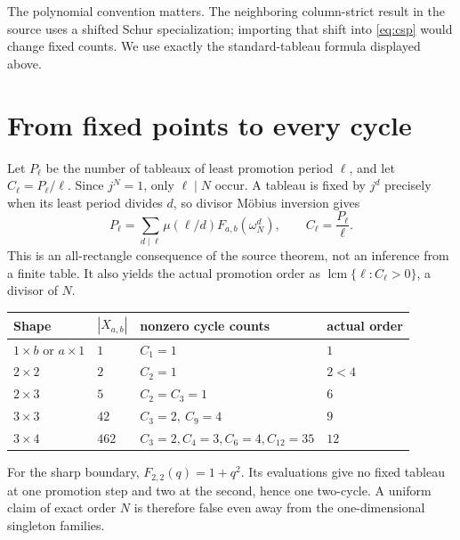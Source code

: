 \documentclass[9pt]{extarticle}
\begin{document}
The polynomial convention matters.  The neighboring column-strict result in
the source uses a shifted Schur specialization; importing that shift into
\eqref{eq:csp} would change fixed counts.  We use exactly the standard-tableau
formula displayed above.

\section{From fixed points to every cycle}
Let $P_\ell$ be the number of tableaux of least promotion period $\ell$, and
let $C_\ell=P_\ell/\ell$.  Since $j^N=1$, only $\ell\mid N$ occur.  A tableau
is fixed by $j^d$ precisely when its least period divides $d$, so divisor
M\"obius inversion gives
\begin{equation}\label{eq:mobius}
 P_\ell=\sum_{d\mid\ell}\mu(\ell/d)
 F_{a,b}(\omega_N^d),\qquad C_\ell=\frac{P_\ell}{\ell}.
\end{equation}
This is an all-rectangle consequence of the source theorem, not an inference
from a finite table.  It also yields the actual promotion order as
$\operatorname{lcm}\{\ell:C_\ell>0\}$, a divisor of $N$.

\begin{center}\small
\begin{tabular}{llll}
\toprule
Shape & $|X_{a,b}|$ & nonzero cycle counts & actual order\\
\midrule
$1\times b$ or $a\times1$ & $1$ & $C_1=1$ & $1$\\
$2\times2$ & $2$ & $C_2=1$ & $2<4$\\
$2\times3$ & $5$ & $C_2=C_3=1$ & $6$\\
$3\times3$ & $42$ & $C_3=2,\ C_9=4$ & $9$\\
$3\times4$ & $462$ & $C_3=2,C_4=3,C_6=4,C_{12}=35$ & $12$\\
\bottomrule
\end{tabular}
\end{center}
For the sharp boundary, $F_{2,2}(q)=1+q^2$.  Its evaluations give no fixed
tableau at one promotion step and two at the second, hence one two-cycle.  A
uniform claim of exact order $N$ is therefore false even away from the
one-dimensional singleton families.
\end{document}
